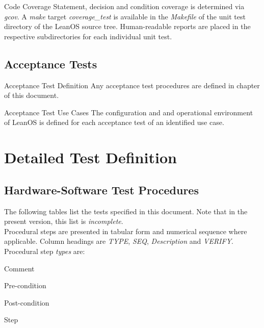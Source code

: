 {Code Coverage}{%
Statement, decision and condition coverage is determined via \emph{gcov}.
A \emph{make} target \emph{coverage\_test} is available in the \emph{Makefile}
of the unit test directory of the LeanOS source tree.
Human-readable reports are placed in the respective subdirectories for each
individual unit test.
}%
{}{}


\section{Acceptance Tests}

{Acceptance Test Definition}{%
Any acceptance test procedures are defined in chapter
\mbox{} of this document.
}%
{}{}

{Acceptance Test Use Cases}{%
The configuration and and operational environment of LeanOS is defined for each
acceptance test of an identified use case.
}%
{}{}


\chapter{Detailed Test Definition}
\label{detailedtestdefinitions}

\section{Hardware-Software Test Procedures}
The following tables list the tests specified in this document. Note that in
the present version, this list is \emph{incomplete}.\\

\noindent
Procedural steps are presented in tabular form and numerical sequence where
applicable. Column headings are \emph{TYPE}, \emph{SEQ}, \emph{Description}
and \emph{VERIFY}.\\

\noindent
Procedural step \emph{types} are:
\begin{description}[labelwidth=4em,leftmargin=\parindent,labelindent=\parindent]
	\item[\textbf{CMT}]	Comment
	\item[\textbf{PRE}]	Pre-condition
	\item[\textbf{PST}]	Post-condition
	\item[\textbf{STP}]	Step
\end{description}


